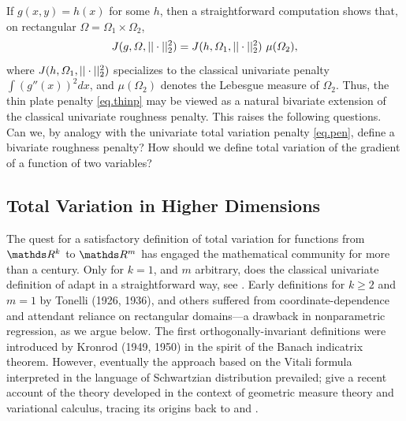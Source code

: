If $g(x,y) = h(x)$ for some $h$, then a straightforward computation
shows that, on rectangular $\varOmega = \varOmega_1 \times \varOmega_2$,
\begin{equation}
\label{eq.redu}
J(g,\varOmega, || \cdot ||_2^2) = J(h,\varOmega_1,|| \cdot ||_2^2) \ \mu( \varOmega_2),
\end{equation}
where $ J(h,\varOmega_1,|| \cdot ||_2^2)$ specializes to the classical
univariate penalty $\int (g'' (x))^2 dx$, and 
$\mu(\varOmega_2)$ denotes the Lebesgue measure of
$\varOmega_2$. Thus, the thin plate penalty \eqref{eq.thinp} may be
viewed as a natural bivariate extension of the classical univariate
roughness penalty. This raises the following questions. Can we,
by analogy with the univariate total variation penalty \eqref{eq.pen},
define a bivariate roughness penalty? How should we define total variation of
the gradient of a function of two variables? 

\subsection{Total Variation in Higher Dimensions}
The quest for a satisfactory definition of total variation for
functions from $\RR^k$ to $\RR^m$ has engaged the mathematical
community for more than a century. Only for $k=1$, and $m$ arbitrary,
does the classical univariate definition of
 adapt in a straightforward way, see
. Early definitions for $k \geq 2$ and $m=1$ by
Tonelli (1926, 1936), \nocite{Ton26,Ton36} and others suffered from
coordinate-dependence and attendant reliance on rectangular
domains---a drawback in nonparametric regression, as we argue below.
The first orthogonally-invariant definitions were introduced by
Kronrod (1949, 1950) \nocite{Kro49,Kro50} in the spirit of the Banach
indicatrix theorem. However, eventually the approach based on the
Vitali formula interpreted in the language of Schwartzian distribution
prevailed;  give a recent account of the theory
developed in the context of geometric measure theory and variational
calculus, tracing its origins back to  and
.

